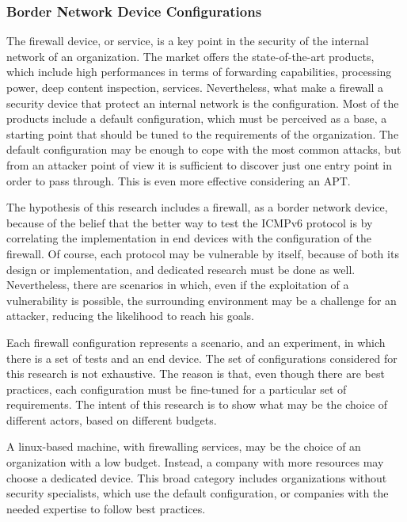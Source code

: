 \documentclass[12pt]{article}
\begin{document}
\subsubsection{Border Network Device Configurations}
\label{subsub:borderConfig}

The firewall device, or service, is a key point in the security of the internal network of an organization. The market offers the state-of-the-art products, which include high performances in terms of forwarding capabilities, processing power, deep content inspection, services. Nevertheless, what make a firewall a security device that protect an internal network is the configuration. Most of the products include a default configuration, which must be perceived as a base, a starting point that should be tuned to the requirements of the organization. The default configuration may be enough to cope with the most common attacks, but from an attacker point of view it is sufficient to discover just one entry point in order to pass through. This is even more effective considering an APT.

The hypothesis of this research includes a firewall, as a border network device, because of the belief that the better way to test the ICMPv6 protocol is by correlating the implementation in end devices with the configuration of the firewall. Of course, each protocol may be vulnerable by itself, because of both its design or implementation, and dedicated research must be done as well. Nevertheless, there are scenarios in which, even if the exploitation of a vulnerability is possible, the surrounding environment may be a challenge for an attacker, reducing the likelihood to reach his goals.

Each firewall configuration represents a scenario, and an experiment, in which there is a set of tests and an end device. The set of configurations considered for this research is not exhaustive. The reason is that, even though there are best practices, each configuration must be fine-tuned for a particular set of requirements. The intent of this research is to show what may be the choice of different actors, based on different budgets.

A linux-based machine, with firewalling services, may be the choice of an organization with a low budget. Instead, a company with more resources may choose a dedicated device. This broad category includes organizations without security specialists, which use the default configuration, or companies with the needed expertise to follow best practices. 
\end{document}
